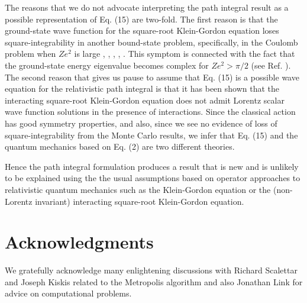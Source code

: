 \documentclass[epsf]{article}
\begin{document}
The reasons that we do not advocate interpreting the path integral
result as a possible representation of Eq. (15) are two-fold.
The first reason is that the ground-state wave function for the 
square-root Klein-Gordon equation loses square-integrability
in another bound-state problem, specifically, 
in the Coulomb problem when $Ze^2$ 
is large \cite{bib:nickisch}, \cite{bib:durand}, \cite{bib:castorina},
\cite{bib:friar}, \cite{bib:hardekopf}. 
This symptom is connected with the fact that the 
ground-state energy eigenvalue becomes complex for $Ze^2 > \pi/2$ 
(see Ref. \cite{bib:herbst}). 
The second reason that gives us pause to assume that Eq. (15) is 
a possible wave equation for the relativistic path integral is
that it has been shown \cite{bib:sucher}
that the interacting square-root Klein-Gordon equation does not 
admit Lorentz sca\-lar wave function solutions 
in the presence of interactions. Since the classical action 
has good symmetry properties, and also, 
since we see no evidence of 
loss of square-integrability from the Monte Carlo results, we 
infer that Eq. (15) and the
quantum mechanics based on Eq. (2) are two different theories.

Hence the path integral formulation produces a result that is 
new and is unlikely to be explained using the the usual assumptions based on 
operator approaches to relativistic quantum mechanics such as the
Klein-Gordon equation or the (non-Lorentz invariant) interacting   
square-root Klein-Gordon equation.

\section{Acknowledgments}
We gratefully acknowledge many enlightening discussions with 
Richard Scalettar and Joseph Kiskis related to the Metropolis algorithm
and also Jonathan Link for advice on computational problems. 
\end{document}

